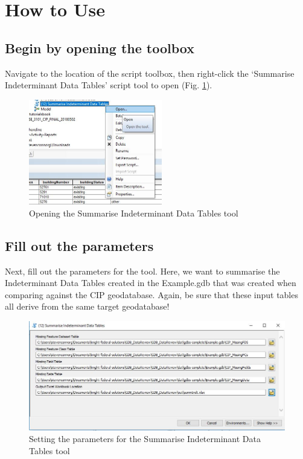\documentclass[openany]{book}
\theoremstyle{definition}
\theoremstyle{definition}
\theoremstyle{definition}
\theoremstyle{remark}
\begin{document}
\section{How to Use}\label{how-to-use-10}

\subsection{Begin by opening the
toolbox}\label{begin-by-opening-the-toolbox-10}

Navigate to the location of the script toolbox, then right-click the
`Summarise Indeterminant Data Tables' script tool to open (Fig.
\ref{fig:summIndtopen}).

\begin{figure}[H]

{\centering \includegraphics[width=2.29in,]{figures/summIndt-open} 

}

\caption{Opening the Summarise Indeterminant Data Tables tool}\label{fig:summIndtopen}
\end{figure}

\subsection{Fill out the parameters}\label{fill-out-the-parameters-10}

Next, fill out the parameters for the tool. Here, we want to summarise
the Indeterminant Data Tables created in the Example.gdb that was
created when comparing against the CIP geodatabase. Again, be sure that
these input tables all derive from the same target geodatabase!

\begin{figure}[H]

{\centering \includegraphics[width=4.48in,]{figures/summIndt-toolparams} 

}

\caption{Setting the parameters for the Summarise Indeterminant Data Tables tool }\label{fig:summIndtparams}
\end{figure}
\end{document}
